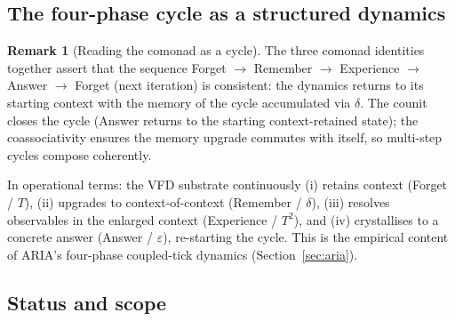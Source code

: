 \documentclass[11pt, a4paper]{amsart}
\theoremstyle{definition}
\newtheorem{remark}[theorem]{Remark}
\begin{document}
\subsection{The four-phase cycle as a structured dynamics}

\begin{remark}[Reading the comonad as a cycle]
\label{rmk:four-phase-cycle}
The three comonad identities together assert that the sequence
Forget $\to$ Remember $\to$ Experience $\to$ Answer $\to$ Forget
(next iteration) is consistent: the dynamics returns to its
starting context with the memory of the cycle accumulated via
$\delta$. The counit closes the cycle (Answer returns to the
starting context-retained state); the coassociativity ensures
the memory upgrade commutes with itself, so multi-step cycles
compose coherently.

In operational terms: the VFD substrate continuously (i) retains
context (Forget / $T$), (ii) upgrades to context-of-context
(Remember / $\delta$), (iii) resolves observables in the
enlarged context (Experience / $T^2$), and (iv) crystallises to
a concrete answer (Answer / $\varepsilon$), re-starting the
cycle. This is the empirical content of ARIA's
four-phase coupled-tick dynamics
(Section~\ref{sec:aria}).
\end{remark}

\subsection{Status and scope}
\end{document}

